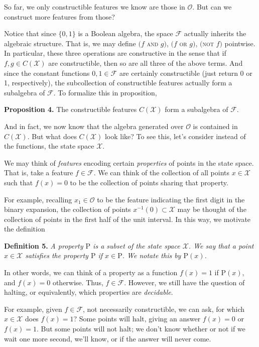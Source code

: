 \documentclass[10]{article}
\theoremstyle{plain}
\begin{document}
So far, we only constructible features we know are those in $\mathcal{O}$. But can we construct more features from those?

Notice that since $\{0,1\}$ is a Boolean algebra, the space $\mathcal{F}$ actually inherits the algebraic structure. That is, we may define $(f$ \textsc{and} $g)$, $(f$ \textsc{or} $g)$, $($\textsc{not} $f)$ pointwise. In particular, these three operations are constructive in the sense that if $f,g \in C(\mathcal{X})$ are constructible, then so are all three of the above terms. And since the constant functions $0,1 \in \mathcal{F}$ are certainly constructible (just return 0 or 1, respectively), the subcollection of constructible features actually form a subalgebra of $\mathcal{F}$. To formalize this in proposition,

\textbf{Proposition 4.} The constructible features $C(\mathcal{X})$ form a subalgebra of $\mathcal{F}$.

And in fact, we now know that the algebra generated over $\mathcal{O}$ is contained in $C(\mathcal{X})$. But what does $C(\mathcal{X})$ look like? To see this, let's consider instead of the functions, the state space $\mathcal{X}$.

We may think of \emph{features} encoding certain \emph{properties} of points in the state space. That is, take a feature $f \in \mathcal{F}$. We can think of the collection of all points $x \in \mathcal{X}$ such that $f(x) = 0$ to be the collection of points sharing that property.

For example, recalling $x_1 \in \mathcal{O}$ to be the feature indicating the first digit in the binary expansion, the collection of points $x^{-1}(0) \subset \mathcal{X}$ may be thought of the collection of points in the first half of the unit interval. In this way, we motivate the definition

\textbf{Definition 5.}
\emph{A \emph{property} $\mathrm{P}$ is a subset of the state space $\mathcal{X}$. We say that a point $x \in \mathcal{X}$ satisfies the property $\mathrm{P}$ if $x \in \mathrm{P}$. We notate this by $\mathrm{P}(x)$.}

In other words, we can think of a property as a function $f(x) = 1$ if $\mathrm{P}(x)$, and $f(x) = 0$ otherwise. Thus, $f \in \mathcal{F}$. However, we still have the question of halting, or equivalently, which properties are \emph{decidable}. 

For example, given $f \in \mathcal{F}$, not necessarily constructible, we can ask, for which $x \in \mathcal{X}$ does $f(x) = 1$? Some points will halt, giving an answer $f(x) = 0$ or $f(x) = 1$. But some points will not halt; we don't know whether or not if we wait one more second, we'll know, or if the answer will never come.
\end{document}
